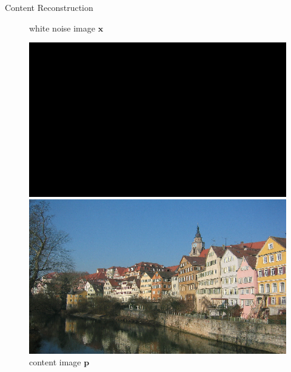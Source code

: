 \documentclass{beamer}
\begin{document}
\begin{frame}{Content Reconstruction}
\begin{figure}[ht]
    \begin{minipage}[b]{0.45\linewidth}
        \centering
        \caption{white noise image $\mathbf{x}$}
        \includegraphics[width=\textwidth]{img/content/noise}
    \end{minipage}
    \hspace{0.5cm}
    \begin{minipage}[b]{0.45\linewidth}
        \centering
        \caption{content image $\mathbf{p}$}
        \includegraphics[width=\textwidth]{img/content/tubingen}
    \end{minipage}
\end{figure}
\end{frame}
\end{document}
